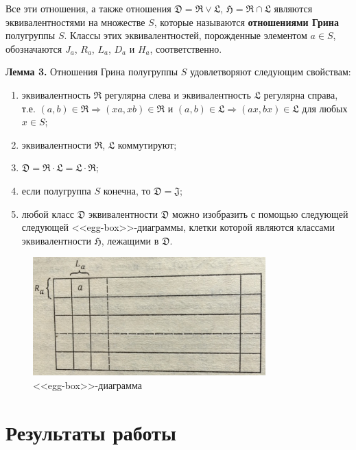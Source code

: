 \documentclass[bachelor, och, labwork]{shiza}
\begin{document}
    Все эти отношения, а также отношения $\mathfrak{D}  = \mathfrak{R} \vee \mathfrak{L}$, $\mathfrak{H}  = \mathfrak{R} \cap \mathfrak{L}$
    являются эквивалентностями на множестве $S$, которые называются \textbf{отношениями Грина} полугруппы $S$. Классы этих эквивалентностей,
    порожденные элементом $a \in S$, обозначаются $J_a$, $R_a$, $L_a$, $D_a$ и $H_a$, соответственно.
  
    \textbf{Лемма 3.} Отношения Грина полугруппы $S$ удовлетворяют следующим свойствам:

    \begin{enumerate}
      \item эквивалентность $\mathfrak{R}$ регулярна слева и эквивалентность $\mathfrak{L}$ регулярна справа, т.е.
      $(a, b) \in \mathfrak{R} \Rightarrow (xa, xb) \in \mathfrak{R}$ и $(a, b) \in \mathfrak{L} \Rightarrow (ax, bx) \in \mathfrak{L}$ 
      для любых $x \in S$;
      \item эквивалентности $\mathfrak{R}$, $\mathfrak{L}$ коммутируют;
      \item $\mathfrak{D} = \mathfrak{R} \cdot \mathfrak{L} = \mathfrak{L} \cdot \mathfrak{R}$;
      \item если полугруппа $S$ конечна, то $\mathfrak{D} = \mathfrak{J}$;
      \item любой класс $\mathfrak{D}$ эквивалентности $\mathfrak{D}$ можно изобразить с помощью следующей следующей <<egg-box>>-диаграммы,
      клетки которой являются классами эквивалентности $\mathfrak{H}$, лежащими в $\mathfrak{D}$.
    \end{enumerate}


      \begin{figure}[H]
        \centering
        \includegraphics[width=0.8\textwidth]{photo/egg-box.png}
        \caption{<<egg-box>>-диаграмма}
      \end{figure}

\section{Результаты работы}
\end{document}
